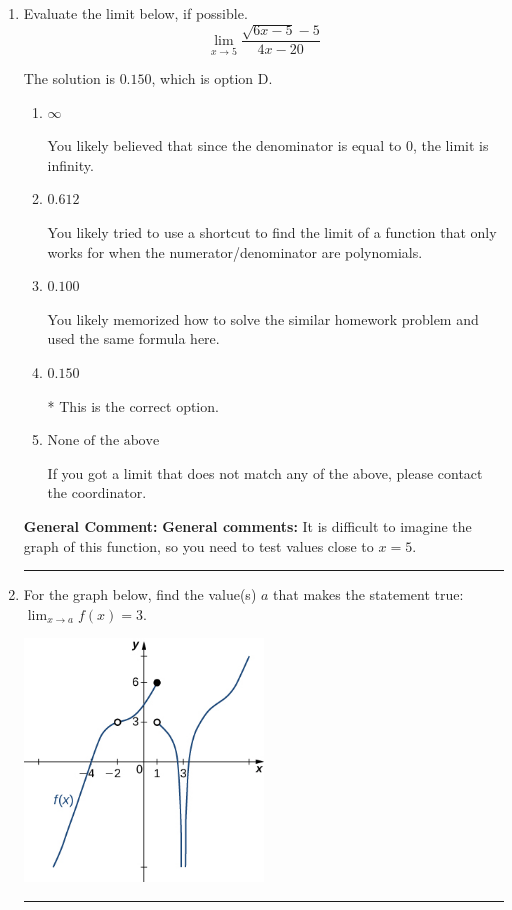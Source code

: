 \documentclass{extbook}[14pt]
\newcommand{\litem}[1]{\item #1

\rule{\textwidth}{0.4pt}}
\begin{document}
\begin{enumerate}\litem{
Evaluate the limit below, if possible.
\[ \lim_{x \rightarrow 5} \frac{\sqrt{6x - 5} - 5}{4x - 20} \]

The solution is \( 0.150 \), which is option D.\begin{enumerate}[label=\Alph*.]
\item \( \infty \)

You likely believed that since the denominator is equal to 0, the limit is infinity.
\item \( 0.612 \)

You likely tried to use a shortcut to find the limit of a function that only works for when the numerator/denominator are polynomials.
\item \( 0.100 \)

You likely memorized how to solve the similar homework problem and used the same formula here.
\item \( 0.150 \)

* This is the correct option.
\item \( \text{None of the above} \)

If you got a limit that does not match any of the above, please contact the coordinator.
\end{enumerate}

\textbf{General Comment:} \textbf{General comments:} It is difficult to imagine the graph of this function, so you need to test values close to $x = 5$.
}
\litem{
For the graph below, find the value(s) $a$ that makes the statement true: $ \displaystyle \lim_{x \rightarrow a} f(x) = 3$.

\begin{center}
    \includegraphics[width=0.5\textwidth]{../Figures/evaluateLimitGraphicallyCopyC.png}
\end{center}




}
\end{enumerate}
\end{document}

